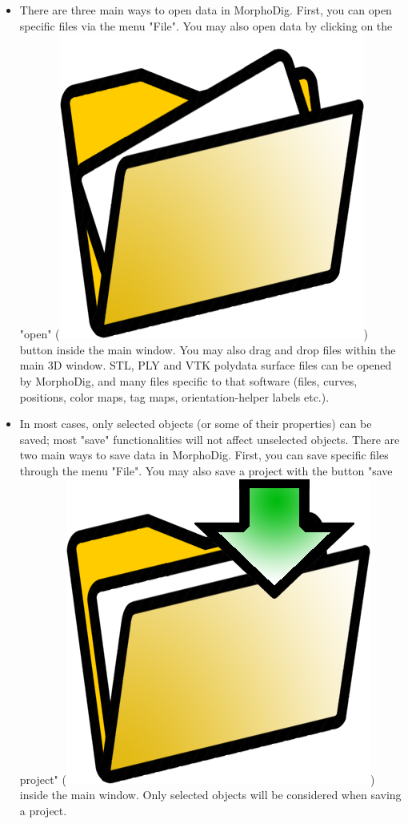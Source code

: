 \begin{itemize}
\item There are three main ways to open data in MorphoDig. First, you can open specific files via the menu "File". You may also open data by clicking on the "open" (\includegraphics[scale=0.03]{images/03/open_data.png}) button inside the main window. You may also drag and drop files within the main 3D window.  
STL, PLY and VTK polydata surface files can be opened by MorphoDig, and many files specific to that software (files, curves, positions, color maps, tag maps, orientation-helper labels etc.).
\item In most cases, only selected objects (or some of their properties) can be saved; most "save" functionalities will not affect unselected objects. There are two main ways to save data in MorphoDig. First, you can save specific files through the menu "File". You may also save a project with the button "save project" (\includegraphics[scale=0.03]{images/03/save_data.png})  inside the main window. Only selected objects will be considered when saving a project.
\end{itemize}





